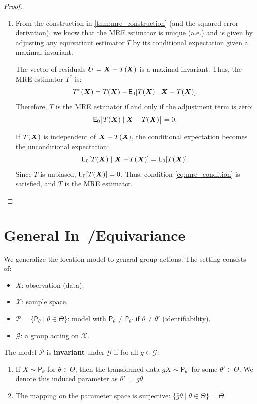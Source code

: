 \begin{proof}
\begin{enumerate}
    \item[(iii)] From the construction in \autoref{thm:mre_construction} (and the squared error derivation), we know that the MRE estimator is unique (a.e.) and is given by adjusting any equivariant estimator \(T\) by its conditional expectation given a maximal invariant.
    
    The vector of residuals \(\boldsymbol{U} = \boldsymbol{X} - T(\boldsymbol{X})\) is a maximal invariant. Thus, the MRE estimator \(T^*\) is:
    \[
    T^*(\boldsymbol{X}) = T(\boldsymbol{X}) - \mathsf{E}_0[T(\boldsymbol{X}) \mid \boldsymbol{X} - T(\boldsymbol{X})].
    \]
    Therefore, \(T\) is the MRE estimator if and only if the adjustment term is zero:
    \begin{equation}
    \label{eq:mre_condition}
    \mathsf{E}_0\big[T(\boldsymbol{X}) \mid \boldsymbol{X} - T(\boldsymbol{X})\big] = 0.
    \end{equation}
    
    If \(T(\boldsymbol{X})\) is independent of \(\boldsymbol{X} - T(\boldsymbol{X})\), the conditional expectation becomes the unconditional expectation:
    \[
    \mathsf{E}_0[T(\boldsymbol{X}) \mid \boldsymbol{X} - T(\boldsymbol{X})] = \mathsf{E}_0[T(\boldsymbol{X})].
    \]
    Since \(T\) is unbiased, \(\mathsf{E}_0[T(\boldsymbol{X})] = 0\). Thus, condition \eqref{eq:mre_condition} is satisfied, and \(T\) is the MRE estimator.
\end{enumerate}
\end{proof}

\section{General In--/Equivariance}
\label{sec:general_in_equivariance}

\label{subsec:setting_invar}
We generalize the location model to general group actions. The setting consists of:
\begin{itemize}
    \item \(X\): observation (data).
    \item \(\mathcal{X}\): sample space.
    \item \(\mathcal{P} = \{ \mathsf{P}_{\theta} \mid \theta \in \Theta \}\): model with \(\mathsf{P}_{\theta} \neq \mathsf{P}_{\theta'}\) if \(\theta \neq \theta'\) (identifiability).
    \item \(\mathcal{G}\): a group acting on \(\mathcal{X}\).
\end{itemize}



\begin{definition}
\label{def:invariant_model}
The model \(\mathcal{P}\) is \textbf{invariant} under \(\mathcal{G}\) if for all \(g \in \mathcal{G}\):
\begin{enumerate}
    \item If \(X \sim \mathsf{P}_{\theta}\) for \(\theta \in \Theta\), then the transformed data \(gX \sim \mathsf{P}_{\theta'}\) for some \(\theta' \in \Theta\). We denote this induced parameter as \(\theta' := \bar{g}\theta\).
    \item The mapping on the parameter space is surjective: \(\{\bar{g}\theta \mid \theta \in \Theta\} = \Theta\).
\end{enumerate}
\end{definition}

